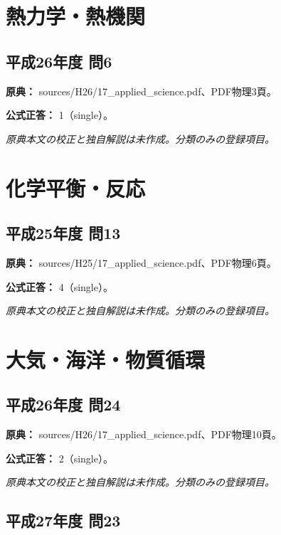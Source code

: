 \section{熱力学・熱機関}

\subsection{平成26年度 問6}
\label{q:h26-reg-applied-06}

\noindent\textbf{原典：} sources/H26/17\_applied\_science.pdf、PDF物理3頁。

\textbf{公式正答：} 1（single）。

\par\textit{原典本文の校正と独自解説は未作成。分類のみの登録項目。}

\section{化学平衡・反応}

\subsection{平成25年度 問13}
\label{q:h25-reg-applied-13}

\noindent\textbf{原典：} sources/H25/17\_applied\_science.pdf、PDF物理6頁。

\textbf{公式正答：} 4（single）。

\par\textit{原典本文の校正と独自解説は未作成。分類のみの登録項目。}

\section{大気・海洋・物質循環}

\subsection{平成26年度 問24}
\label{q:h26-reg-applied-24}

\noindent\textbf{原典：} sources/H26/17\_applied\_science.pdf、PDF物理10頁。

\textbf{公式正答：} 2（single）。

\par\textit{原典本文の校正と独自解説は未作成。分類のみの登録項目。}

\subsection{平成27年度 問23}
\label{q:h27-reg-applied-23}

